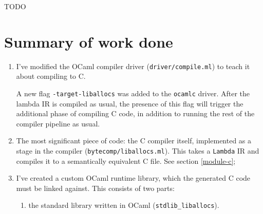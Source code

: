 \documentclass[12pt,a4paper,twoside,openright]{report}
\begin{document}
TODO

\section{Summary of work done}

\begin{enumerate}
  \item I've modified the OCaml compiler driver (\lstinline!driver/compile.ml!) to teach it about compiling to C.

    A new flag \lstinline!-target-liballocs! was added to the \lstinline!ocamlc! driver. After the
    lambda IR is compiled as usual, the presence of this flag will
    trigger the additional phase of compiling C code, in addition
    to running the rest of the compiler pipeline as usual.
  \item The most significant piece of code: the C compiler itself, implemented
      as a stage in the compiler (\lstinline!bytecomp/liballocs.ml!). This
      takes a \lstinline!Lambda! IR and compiles it to a semantically
      equivalent C file. See section \ref{module-c};
  \item I've created a custom OCaml runtime library, which the generated C
      code must be linked against. This consists of two parts:
    \begin{enumerate}
      \item the standard library written in OCaml (\lstinline!stdlib_liballocs!).


\end{enumerate}
\end{enumerate}
\end{document}

